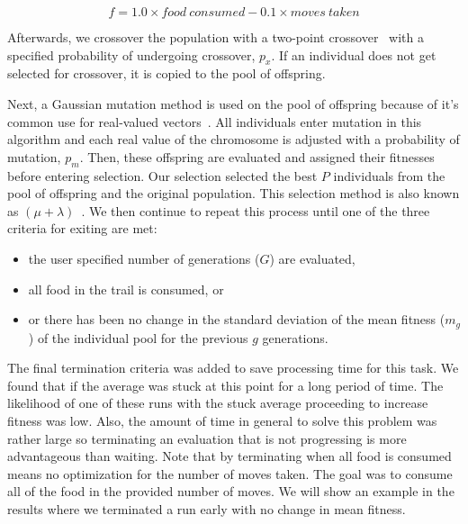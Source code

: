 \begin{equation} \label{eq:fitness_equation}
f = 1.0 \times food\:consumed - 0.1 \times moves\:taken
\end{equation}

Afterwards, we crossover the population with a two-point crossover~\cite{De_Jong1975-wc} with a specified probability of undergoing crossover, $p_x$. If an individual does not get selected for crossover, it is copied to the pool of offspring.

Next, a Gaussian mutation method is used on the pool of offspring because of it's common use for real-valued vectors~\cite{Baeck2000-co}. All individuals enter mutation in this algorithm and each real value of the chromosome is adjusted with a probability of mutation, $p_m$. Then, these offspring are evaluated and assigned their fitnesses before entering selection. Our selection selected the best $P$ individuals from the pool of offspring and the original population. This selection method is also known as $(\mu + \lambda)$~\cite{Schwefel1976-er}. We then continue to repeat this process until one of the three criteria for exiting are met:

\begin{itemize}
\item the user specified number of generations ($G$) are evaluated,
\item all food in the trail is consumed, or
\item or there has been no change in the standard deviation of the mean fitness ($m_g$) of the individual pool for the previous $g$ generations.
\end{itemize}

The final termination criteria was added to save processing time for this task. We found that if the average was stuck at this point for a long period of time. The likelihood of one of these runs with the stuck average proceeding to increase fitness was low. Also, the amount of time in general to solve this problem was rather large so terminating an evaluation that is not progressing is more advantageous than waiting. Note that by terminating when all food is consumed means no optimization for the number of moves taken. The goal was to consume all of the food in the provided number of moves. We will show an example in the results where we terminated a run early with no change in mean fitness.

